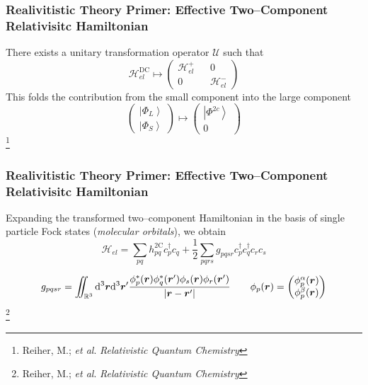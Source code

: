\documentclass[usepdftitle=false,10pt]{beamer}
\newcommand{\ket}[1]{\left\vert #1 \right\rangle}         %
\newcommand*\vc[1]{\boldsymbol{#1}}
\newcommand*\op[1]{\mathcal{#1}}
\renewcommand*\iint[0]{\int\hspace{-8pt}\int}
\newcommand\blfootnote[1]{%
  \begingroup
  \renewcommand\thefootnote{}\footnote{#1}%
  \addtocounter{footnote}{-1}%
  \endgroup
}
\begin{document}
\begin{frame}
  \frametitle{Realivitistic Theory Primer: Effective Two--Component Relativisitc
  Hamiltonian}

  There exists a unitary transformation operator $\op{U}$ such that
  \begin{equation*}
    \op{H}_{el}^\mathrm{DC} \mapsto 
    \begin{pmatrix} \op{H}_{el}^+ && 0 \\ 0 && \op{H}_{el}^- \end{pmatrix} 
  \end{equation*}
  This folds the contribution from the small component into the large component 
  \begin{equation*}
    \begin{pmatrix} \ket{\Phi_L} \\ \ket{\Phi_S} \end{pmatrix}\mapsto
    \begin{pmatrix} \ket{\Phi^{2c}} \\ 0 \end{pmatrix}
  \end{equation*}
  \blfootnote{\tiny Reiher, M.; \emph{et al}. \emph{Relativistic Quantum Chemistry}}
\end{frame}

\begin{frame}
  \frametitle{Realivitistic Theory Primer: Effective Two--Component Relativisitc
  Hamiltonian}

  Expanding the transformed two--component Hamiltonian in the basis of single
  particle Fock states (\emph{molecular orbitals}), we obtain
  \begin{equation*}
    \op{H}_{el} = \sum_{pq}h^\mathrm{2C}_{pq} c_p^\dagger c_q +
    \frac{1}{2}\sum_{pqrs} g_{pqsr}c_p^\dagger c_q^\dagger c_r c_s
  \end{equation*}

  \begin{equation*}
    g_{pqsr} = \iint_{\mathbb{R}^3}\mathrm{d}^3\vc{r} \mathrm{d}^3\vc{r}'
      \frac{\phi^*_p(\vc{r})\phi^*_q(\vc{r}')\phi_s(\vc{r})\phi_r(\vc{r}')}
           {\vert \vc{r} - \vc{r}' \vert} \qquad 
    \phi_p(\vc{r}) = 
      \begin{pmatrix} \phi^\alpha_p(\vc{r}) \\ \phi^\beta_p(\vc{r}) \end{pmatrix}
  \end{equation*}
  \blfootnote{\tiny Reiher, M.; \emph{et al}. \emph{Relativistic Quantum Chemistry}}

\end{frame}
\end{document}
